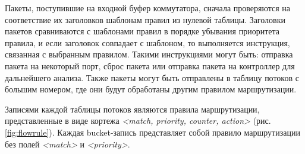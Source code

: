 \documentclass[../thesis.tex]{subfiles}
\begin{document}
Пакеты, поступившие на входной буфер коммутатора, сначала проверяются на соответствие их заголовков шаблонам правил из нулевой таблицы.
Заголовки пакетов сравниваются с шаблонами правил в порядке убывания приоритета правила, и если заголовок совпадает с шаблоном, то выполняется инструкция, связанная с выбранным правилом.
Такими инструкциями могут быть: отправка пакета на некоторый порт, сброс пакета или отправка пакета на контроллер для дальнейшего анализа.
Также пакеты могут быть отправлены в таблицу потоков с большим номером, где они будут обработаны другим правилом маршрутизации.

Записями каждой таблицы потоков являются правила маршрутизации, представленные в виде кортежа \textit{<match, priority, counter, action>} (рис. \ref{fig:flowrule}).
Каждая bucket-запись представляет собой правило маршрутизации без полей \textit{<match>} и \textit{<priority>}.
\end{document}
